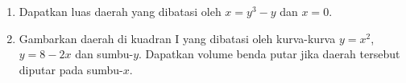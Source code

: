 \documentclass[10pt,openany,a4paper]{article}
\theoremstyle{definition}
\theoremstyle{definition}
\theoremstyle{plain}
\begin{document}
\begin{enumerate}
    \item Dapatkan luas daerah yang dibatasi oleh $x=y^3-y$ dan $x=0$.







    \item Gambarkan daerah di kuadran I yang dibatasi oleh kurva-kurva $y=x^2$, $y=8-2x$ dan sumbu-$y$. Dapatkan volume benda putar jika daerah tersebut diputar pada sumbu-$x$.





\end{enumerate}
\end{document}
